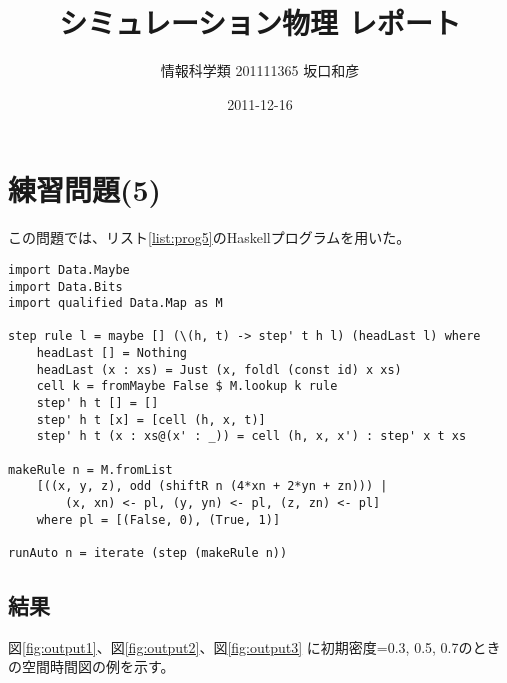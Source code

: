\documentclass{jsarticle}
\title{シミュレーション物理 レポート}
\author{情報科学類 201111365 坂口和彦}
\date{2011-12-16}
\begin{document}
\maketitle

\section{練習問題(5)}

この問題では、リスト\ref{list:prog5}のHaskellプログラムを用いた。

\begin{lstlisting}[style=program, label=list:prog5, caption=練習問題(5)のプログラム]
import Data.Maybe
import Data.Bits
import qualified Data.Map as M

step rule l = maybe [] (\(h, t) -> step' t h l) (headLast l) where
    headLast [] = Nothing
    headLast (x : xs) = Just (x, foldl (const id) x xs)
    cell k = fromMaybe False $ M.lookup k rule
    step' h t [] = []
    step' h t [x] = [cell (h, x, t)]
    step' h t (x : xs@(x' : _)) = cell (h, x, x') : step' x t xs

makeRule n = M.fromList
    [((x, y, z), odd (shiftR n (4*xn + 2*yn + zn))) |
        (x, xn) <- pl, (y, yn) <- pl, (z, zn) <- pl]
    where pl = [(False, 0), (True, 1)]

runAuto n = iterate (step (makeRule n))
\end{lstlisting}

\subsection{結果}

図\ref{fig:output1}、図\ref{fig:output2}、図\ref{fig:output3}
に初期密度=0.3, 0.5, 0.7のときの空間時間図の例を示す。
\end{document}
